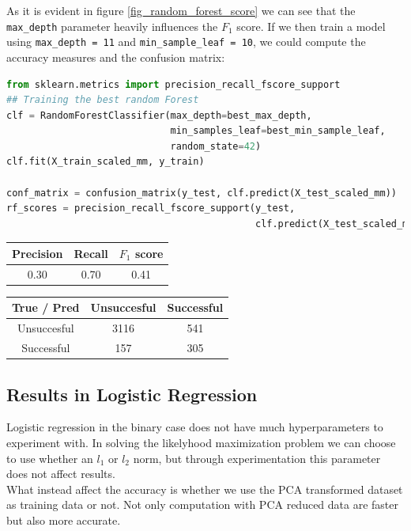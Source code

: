 As it is evident in figure \ref{fig_random_forest_score} we can see that the \texttt{max\_depth} parameter heavily influences the \(F_1\) score. If we then train a model using \texttt{max\_depth = 11} and \texttt{min\_sample\_leaf = 10}, we could compute the accuracy measures and the confusion matrix:

\begin{lstlisting}[language=Python, caption= Deploying the Random forest with the best parameters]
from sklearn.metrics import precision_recall_fscore_support
## Training the best random Forest
clf = RandomForestClassifier(max_depth=best_max_depth,
                             min_samples_leaf=best_min_sample_leaf, 
                             random_state=42)
clf.fit(X_train_scaled_mm, y_train)

conf_matrix = confusion_matrix(y_test, clf.predict(X_test_scaled_mm))
rf_scores = precision_recall_fscore_support(y_test,
                                            clf.predict(X_test_scaled_mm))
\end{lstlisting}
\begin{center}
    \begin{tabular}{|c|c|c|}
        \hline
        Precision & Recall & \(F_1\) score \\
        \hline
        0.30 & 0.70 & 0.41 \\
        \hline
    \end{tabular}
    \quad     
    \begin{tabular}{|c|c|c|}
        \hline
         True / Pred & Unsuccesful & Successful \\
        \hline
        Unsuccesful & 3116 & 541 \\
        \hline
        Successful & 157 & 305\\
        \hline
    \end{tabular}
\end{center}
\subsection{Results in Logistic Regression}
Logistic regression in the binary case does not have much hyperparameters to experiment with. In solving the likelyhood maximization problem we can choose to use whether an \(l_1\) or \(l_2\) norm, but through experimentation this parameter does not affect results. \\
What instead affect the accuracy is whether we use the PCA transformed dataset as training data or not. Not only computation with PCA reduced data are faster but also more accurate. 

